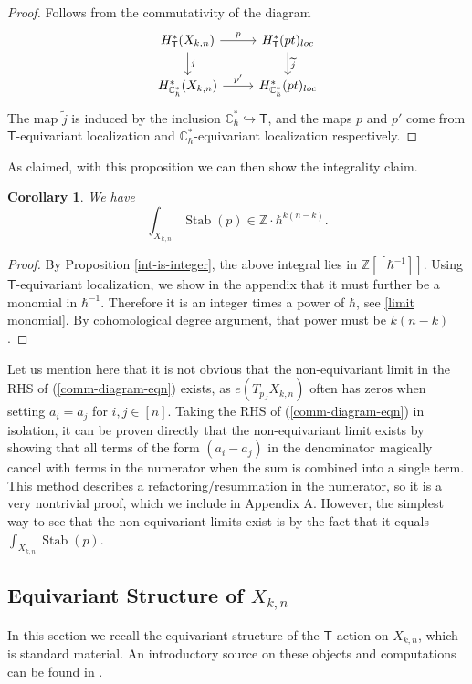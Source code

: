 \documentclass[12 pt]{article}
\theoremstyle{plain}
\theoremstyle{plain}
\theoremstyle{plain}
\newtheorem{corollary}{Corollary}[section]
\theoremstyle{plain}
\theoremstyle{plain}
\theoremstyle{plain}
\theoremstyle{plain}
\theoremstyle{plain}
\theoremstyle{plain}
\theoremstyle{plain}
\theoremstyle{remark}
\theoremstyle{remark}
\theoremstyle{definition}
\theoremstyle{definition}
\theoremstyle{definition}
\theoremstyle{definition}
\theoremstyle{definition}
\theoremstyle{definition}
\DeclareMathOperator{\Stab}{Stab}
\newcommand{\bT}{\mathsf{T}}
\begin{document}
\begin{proof}
Follows from the commutativity of the diagram
\[
\begin{tikzcd}
    H^{*}_{\bT}(X_{k,n})\arrow[r,"p"]\arrow[d,"j"] &H^{*}_{\bT}(pt)_{loc}\arrow[d,"\widetilde{j}"]\\
    H^{*}_{\mathbb{C}^{*}_{\hbar}}(X_{k,n})\arrow[r,"p'"] &H^{*}_{\mathbb{C}^{*}_{\hbar}}(pt)_{loc}
\end{tikzcd}
\]
The map $\widetilde{j}$ is induced by the inclusion $\mathbb{C}^{*}_{\hbar}\hookrightarrow\bT$, and the maps $p$ and $p'$ come from $\bT$-equivariant localization and $\mathbb{C}^{*}_{\hbar}$-equivariant localization respectively.
\end{proof}

As claimed, with this proposition we can then show the integrality claim.

\begin{corollary}
We have
\[
\int_{X_{k,n}}\Stab(p)\in \mathbb Z\cdot \hbar^{k(n-k)}. 
\]
\end{corollary}

\begin{proof}
By Proposition \ref{int-is-integer}, the above integral lies in $\mathbb Z[[\hbar^{-1}]]$. Using $\bT$-equivariant localization, we show in the appendix that it must further be a monomial in $\hbar^{-1}$. Therefore it is an integer times a power of $\hbar$, see \ref{limit monomial}. By cohomological degree argument, that power must be $k(n-k)$. 
\end{proof}

Let us mention here that it is not obvious that the non-equivariant limit in the RHS of (\ref{comm-diagram-eqn}) exists, as $e(T_{p_J}X_{k,n})$ often has zeros when setting $a_i=a_j$ for $i,j\in [n]$. Taking the RHS of (\ref{comm-diagram-eqn}) in isolation, it can be proven directly that the non-equivariant limit exists by showing that all terms of the form $(a_i-a_j)$ in the denominator magically cancel with terms in the numerator when the sum is combined into a single term. This method describes a refactoring/resummation in the numerator, so it is a very nontrivial proof, which we include in Appendix A. However, the simplest way to see that the non-equivariant limits exist is by the fact that it equals $\int_{X_{k,n}}\Stab(p)$.

\subsection{Equivariant Structure of $X_{k,n}$}\label{mgraph}
    In this section we recall the equivariant structure of the $\bT$-action on $X_{k,n}$, which is standard material. An introductory source on these objects and computations can be found in \cite{AF}. 
\end{document}
